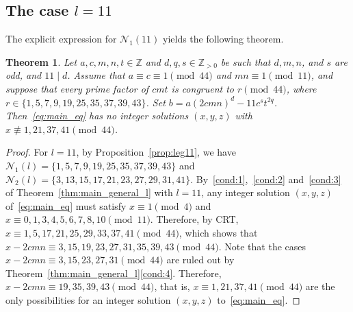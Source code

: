 \documentclass[11pt,a4paper]{amsart}
\newcommand{\ZZ}{\mathbb{Z}}
\theoremstyle{plain}
\newtheorem{theorem}{Theorem}[section]
\theoremstyle{definition}
\begin{document}
\subsection{The case \texorpdfstring{$l = 11$}{l = 11}}
The explicit expression for $\mathcal{N}_1(11)$ yields the following theorem.
\begin{theorem}\label{thm:main11_gen}
Let $a, c, m, n, t \in \ZZ$ and $d, q, s \in \ZZ_{>0}$ be such that $d, m, n$, and $s$ are odd, and $11 \mid d$. Assume that $a \equiv c \equiv 1 \pmod{44}$ and $mn \equiv 1 \pmod{11}$, and suppose that every prime factor of $cmt$ is congruent to $r \pmod{44}$, where $r\in  \{1, 5,7, 9, 19, 25, 35,37,39,43\}$. Set $b = a  (2c m n)^d - 11c^s t^{2q}$. Then~\eqref{eq:main_eq} has no integer solutions $(x,y,z) $ with $x \not\equiv 1, 21, 37, 41 \pmod{44}$.
\end{theorem}
\begin{proof}
    For $l=11$, by Proposition~\ref{prop:leg11}, we have $\mathcal{N}_1(l) = \{1, 5,7, 9, 19, 25, 35,37,39,43\} $ and $\mathcal{N}_2(l) = \{ 3, 13, 15, 17, 21, 23,27,29,31,41\}$. By~\ref{cond:1},~\ref{cond:2} and~\ref{cond:3} of Theorem~\ref{thm:main_general_l} with $l=11$, any integer solution $(x,y,z)$ of~\eqref{eq:main_eq} must satisfy $x\equiv1\pmod{4}$ and $x \equiv 0,1,3,4,5,6,7,8,10\pmod{11}$. Therefore, by CRT, $x \equiv 1,5,17,21,25,29,33,37,41\pmod{44}$, which shows that $x-2cmn\equiv3,15,19,23,27,31,35,39,43\pmod{44}$. Note that the cases $x - 2cmn \equiv 3,15,23,27,31 \pmod{44}$ are ruled out by Theorem~\ref{thm:main_general_l}\ref{cond:4}. Therefore, $x-2cmn\equiv19,35,39,43\pmod{44}$, that is, $x\equiv 1,21,37,41\pmod{44}$ are the only possibilities for an integer solution $(x,y,z)$ to~\eqref{eq:main_eq}.
\end{proof}
\end{document}
